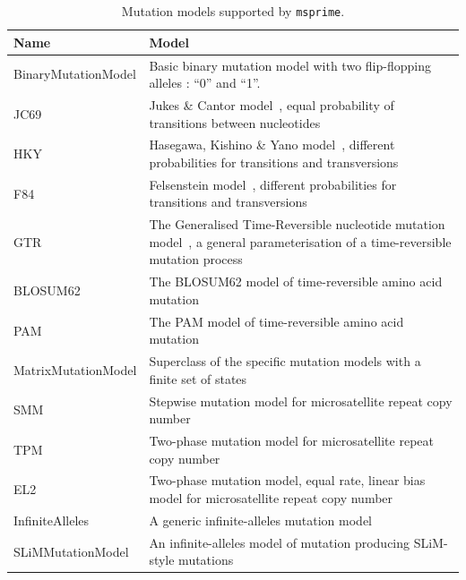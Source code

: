 \documentclass[graybox]{svmult}
\begin{document}
\begin{table}
\centering
\begin{tabular}{|l|p{8cm}|}
\hline
\textbf{Name} & \textbf{Model} \\
\hline
BinaryMutationModel & Basic binary mutation model with two flip-flopping alleles : “0” and “1”. \\
\hline
JC69 & Jukes \& Cantor model~\citep{jukes1969evolution}, equal probability of transitions between nucleotides \\
\hline
HKY & Hasegawa, Kishino \& Yano model~\citep{hasegawa_1985_dating}, different probabilities for transitions and transversions \\
\hline
F84 & Felsenstein model~\citep{felsenstein1996hidden}, different probabilities for transitions and transversions \\
\hline
GTR & The Generalised Time-Reversible nucleotide mutation model~\citep{tavare1986some}, a general parameterisation of a time-reversible mutation process \\
\hline
BLOSUM62 & The BLOSUM62 model of time-reversible amino acid mutation~\citep{henikoff1992amino} \\
\hline
PAM & The PAM model of time-reversible amino acid mutation~\citep{dayhoff1978} \\
\hline
MatrixMutationModel & Superclass of the specific mutation models with a finite set of states \\
\hline
SMM & Stepwise mutation model for microsatellite repeat copy number~\citep{kimura_1978_stepwise} \\
\hline
TPM & Two-phase mutation model for microsatellite repeat copy number~\citep{dirienzo_1994_mutational} \\
\hline
EL2 & Two-phase mutation model, equal rate, linear bias model for microsatellite repeat copy number~\citep{garza_1995_microsatellite} \\
\hline
InfiniteAlleles & A generic infinite-alleles mutation model \\
\hline
SLiMMutationModel & An infinite-alleles model of mutation producing SLiM-style mutations \\
\hline
\end{tabular}
\caption{Mutation models supported by \texttt{msprime}.}
\label{tab:mutation-models}
\end{table}
\end{document}
